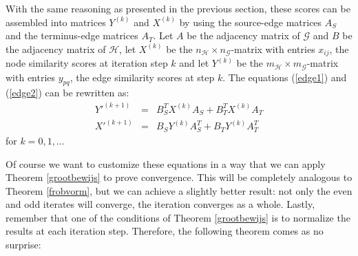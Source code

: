 \documentclass[a4paper,11pt]{report}
\newcommand{\graf}{\mathscr{G}}
\newcommand{\grafeen}{\mathscr{H}}
\begin{document}
With the same 
 reasoning as presented in the previous section, these scores can be assembled into matrices $Y^{(k)}$ and $X^{(k)}$ 
by using the source-edge matrices $A_S$ and the terminus-edge matrices $A_T$. Let $A$ be the adjacency matrix of $\graf$ and $B$ be the adjacency
matrix of $\grafeen$, let $X^{(k)}$ be the $n_\grafeen \times n_\graf$-matrix with entries $x_{ij}$, the node similarity scores at iteration step $k$ 
and let $Y^{(k)}$ be the $m_\grafeen \times m_\graf$-matrix with entries $y_{pq}$, the edge similarity scores at step $k$. The equations (\ref{edge1}) and (\ref{edge2}) 
can be rewritten as:
\begin{eqnarray}
  Y'^{(k+1)} &=& B_S^TX^{(k)}A_S + B_T^TX^{(k)}A_T\label{edgematrix1}\\
   X'^{(k+1)} &=& B_SY^{(k)}A_S^T + B_TY^{(k)}A^T_T\label{edgematrix2}
 \end{eqnarray}
 for  $k =  0,1,\ldots$
 
 Of course we want to customize these equations in a way that we can apply Theorem \ref{grootbewijs} to prove convergence. 
 This will be completely analogous to Theorem \ref{frobvorm}, but we can achieve a slightly better result: not only the even and odd iterates
 will converge, the iteration converges as a whole. Lastly, remember that one of the conditions of Theorem \ref{grootbewijs} is to 
 normalize the results at each iteration step. Therefore, the following theorem comes as no surprise:
\end{document}
